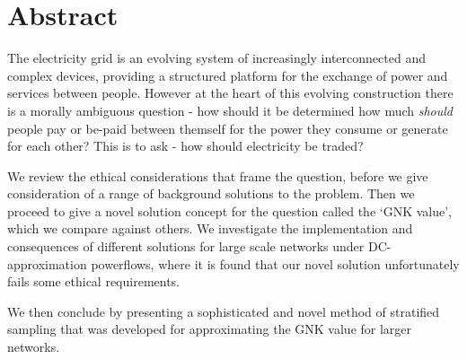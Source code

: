 \chapter*{Abstract}
\vspace{-1em}
The electricity grid is an evolving system of increasingly interconnected and complex devices, providing a structured platform for the exchange of power and services between people.
However at the heart of this evolving construction there is a morally ambiguous question - how should it be determined how much \textit{should} people pay or be-paid between themself for the power they consume or generate for each other?
This is to ask - how should electricity be traded?

We review the ethical considerations that frame the question, before we give consideration of a range of background solutions to the problem.
Then we proceed to give a novel solution concept for the question called the `GNK value', which we compare against others.
We investigate the implementation and consequences of different solutions for large scale networks under DC-approximation powerflows, where it is found that our novel solution unfortunately fails some ethical requirements.

We then conclude by presenting a sophisticated and novel method of stratified sampling that was developed for approximating the GNK value for larger networks.

